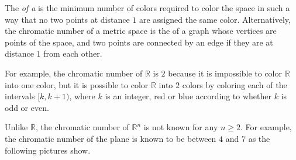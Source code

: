 \documentclass[12pt]{article}
\begin{document}

The \emph{ of a } is the minimum number of
colors required to color the space in such a way that no two
points at distance $1$ are assigned the same color. Alternatively,
the chromatic number of a metric space is the
 of a graph whose
vertices are points of the space, and two points are connected by
an edge if they are at distance $1$ from each other.

For example, the chromatic number of $\mathbb{R}$ is $2$ because
it is impossible to color $\mathbb{R}$ into one color, but it is
possible to color $\mathbb{R}$ into $2$ colors by coloring each of
the intervals $[k,k+1)$, where $k$ is an integer, red or blue
according to whether $k$ is odd or even.

Unlike $\mathbb{R}$, the chromatic number of $\mathbb{R}^n$ is not
known for any $n\geq 2$. For example, the chromatic number of the
plane is known to be between $4$ and $7$ as the following pictures
show.
\end{document}
